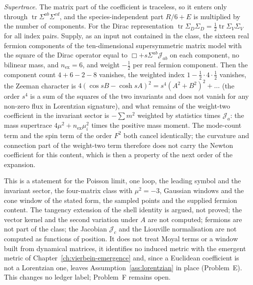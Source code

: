 \emph{Supertrace.} The matrix part of the coefficient is traceless, so it enters only through \(\operatorname{tr}\Sigma^{ab}\Sigma^{cd}\), and the species-independent part \(R/6+E\) is multiplied by the number of components. For the Dirac representation \(\operatorname{tr}\Sigma_D\Sigma_D=\tfrac12\operatorname{tr}\Sigma_V\Sigma_V\) for all index pairs. Supply, as an input not contained in the class, the sixteen real fermion components of the ten-dimensional supersymmetric matrix model with the square of the Dirac operator equal to \(\Box+s\Sigma^{ab}\mathcal J_{ab}\) on each component, no bilinear mass, and \(n_{\mathrm{ex}}=6\), and weight \(-\tfrac12\) per real fermion component. Then the component count \(4+6-2-8\) vanishes, the weighted index \(1-\tfrac12\cdot4\cdot\tfrac12\) vanishes, the Zeeman character is \(4(\cos sB-\cosh sA)^2=s^4(A^2+B^2)^2+\dots\) (the order \(s^4\) is a sum of the squares of the two invariants and does not vanish for any non-zero flux in Lorentzian signature), and what remains of the weight-two coefficient in the invariant sector is \(-\sum m^2\) weighted by statistics times \(\mathcal J_a\): the mass supertrace \(4\mu^2+n_{\mathrm{ex}}\mu_i^2\) times the positive mass moment. The mode-count term and the spin term of the order \(F^2\) both cancel identically; the curvature and connection part of the weight-two term therefore does not carry the Newton coefficient for this content, which is then a property of the next order of the expansion.

This is a statement for the Poisson limit, one loop, the leading symbol and the invariant sector, the four-matrix class with \(\mu^2=-3\), Gaussian windows and the cone window of the stated form, the sampled points and the supplied fermion content. The tangency extension of the shell identity is argued, not proved; the vector kernel and the second variation under \(A\) are not computed; fermions are not part of the class; the Jacobian \(\mathcal J_c\) and the Liouville normalisation are not computed as functions of position. It does not treat Moyal terms or a window built from dynamical matrices, it identifies no induced metric with the emergent metric of Chapter~\ref{ch:vierbein-emergence} and, since a Euclidean coefficient is not a Lorentzian one, leaves Assumption~\ref{ass:lorentzian} in place (Problem~E). This changes no ledger label; Problem~F remains open.
